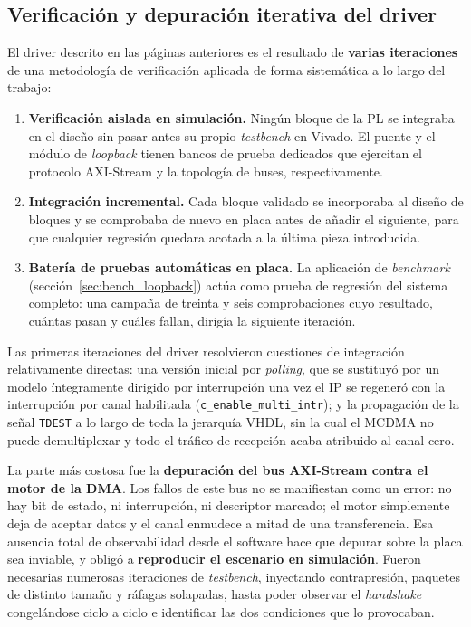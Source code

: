 \subsection{Verificación y depuración iterativa del driver} \label{sec:transporte_depuracion}

El driver descrito en las páginas anteriores es el resultado de \textbf{varias iteraciones} de una
metodología de verificación aplicada de forma sistemática a lo largo del trabajo:

\begin{enumerate}
    \item \textbf{Verificación aislada en simulación.} Ningún bloque de la PL se integraba en el
    diseño sin pasar antes su propio \textit{testbench} en Vivado. El puente y el módulo de
    \textit{loopback} tienen bancos de prueba dedicados que ejercitan el protocolo AXI-Stream y
    la topología de buses, respectivamente.
    \item \textbf{Integración incremental.} Cada bloque validado se incorporaba al diseño de
    bloques y se comprobaba de nuevo en placa antes de añadir el siguiente, para que cualquier
    regresión quedara acotada a la última pieza introducida.
    \item \textbf{Batería de pruebas automáticas en placa.} La aplicación de \textit{benchmark}
    (sección~\ref{sec:bench_loopback}) actúa como prueba de regresión del sistema completo: una
    campaña de treinta y seis comprobaciones cuyo resultado, cuántas pasan y cuáles fallan,
    dirigía la siguiente iteración.
\end{enumerate}

Las primeras iteraciones del driver resolvieron cuestiones de integración relativamente directas:
una versión inicial por \textit{polling}, que se sustituyó por un modelo íntegramente dirigido por
interrupción una vez el IP se regeneró con la interrupción por canal habilitada
(\texttt{c\_enable\_multi\_intr}); y la propagación de la señal \texttt{TDEST} a lo largo de toda
la jerarquía VHDL, sin la cual el MCDMA no puede demultiplexar y todo el tráfico de recepción
acaba atribuido al canal cero.

La parte más costosa fue la \textbf{depuración del bus AXI-Stream contra el motor de la DMA}. Los fallos de este bus no se manifiestan como un error:
no hay bit de estado, ni interrupción, ni descriptor marcado; el motor simplemente deja de
aceptar datos y el canal enmudece a mitad de una transferencia. Esa ausencia total de
observabilidad desde el software hace que depurar sobre la placa sea inviable, y obligó a
\textbf{reproducir el escenario en simulación}. Fueron necesarias numerosas iteraciones de
\textit{testbench}, inyectando contrapresión, paquetes de distinto tamaño y ráfagas
solapadas, hasta poder observar el \textit{handshake} congelándose ciclo a ciclo e identificar
las dos condiciones que lo provocaban.

